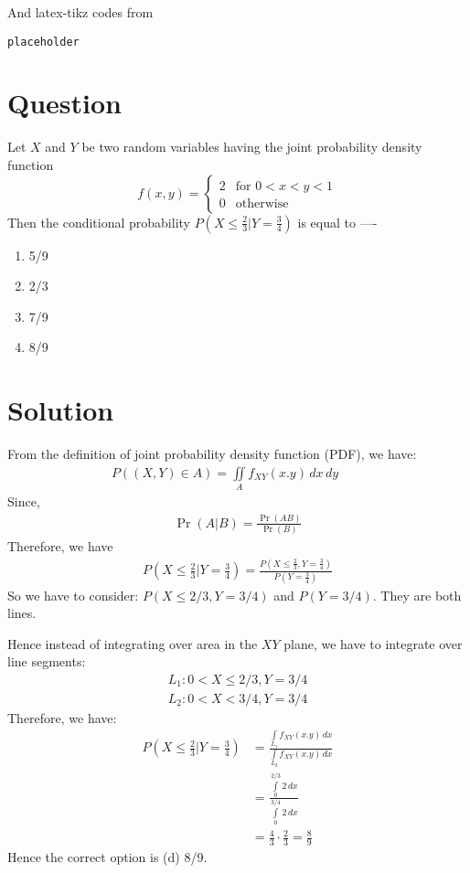 \documentclass[journal,12pt,twocolumn]{IEEEtran}
\begin{document}
And latex-tikz codes from 
\begin{lstlisting}
placeholder
\end{lstlisting}

\section*{Question}
Let $X$ and $Y$ be two random variables having the joint probability density function
\[
    f(x,y) = \begin{cases}
        2 & \text{for } 0 < x < y < 1\\
        0 & \text{otherwise}
        \end{cases} 
  \] 
Then the conditional probability $P(X\leq \frac{2}{3}|Y = \frac{3}{4})$ is equal to ----
\begin{enumerate}
    \item 5/9
    \item 2/3
    \item 7/9
    \item 8/9
\end{enumerate}
\section*{Solution}
From the definition of joint probability density function (PDF), we have:
\begin{align}
P((X,Y)\in A) = 
\iint\limits_A f_{XY}(x.y)\,dx\,dy\qquad
\end{align}
Since,
\begin{align}
\Pr(A|B)=\frac{\Pr(AB)}{\Pr(B)}    
\end{align}
Therefore, we have 
\begin{align}
P(X\leq \frac{2}{3}|Y = \frac{3}{4}) = \frac{P(X\leq \frac{2}{3}, Y = \frac{3}{4})}{P(Y = \frac{3}{4})}  
\end{align}
So we have to consider: $P(X \leq 2/3, Y = 3/4)$ and $P(Y = 3/4)$. They are both lines. 

Hence instead of integrating over area in the $XY$ plane, we have to integrate over line segments:
\begin{align}
L_1 : 0 < X \leq 2/3, Y = 3/4 \\
L_2 : 0 < X < 3/4, Y = 3/4  
\end{align}
Therefore, we have:
\begin{align}
P(X\leq \frac{2}{3}|Y = \frac{3}{4}) &= \frac{\int\limits_{L_1} f_{XY}(x.y)\,dx}{\int\limits_{L_2} f_{XY}(x.y)\,dx}  \\
&= \frac{\int\limits_{0}^{2/3} 2\,dx}{\int\limits_{0}^{3/4} 2\,dx} \\
&= \frac{4}{3} \cdot \frac{2}{3} = \frac{8}{9}
\end{align}
Hence the correct option is (d) 8/9.
\end{document}
